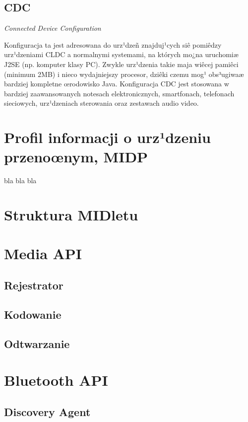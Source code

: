 \subsection{CDC}
\emph{Connected Device Configuration}

 Konfiguracja ta jest adresowana do urz¹dzeñ znajduj¹cych siê
 pomiêdzy urz¹dzeniami CLDC a normalnymi systemami, na których mo¿na
 uruchomiæ J2SE (np. komputer klasy PC). Zwykle urz¹dzenia takie
 maja wiêcej pamiêci (minimum 2MB) i nieco wydajniejszy procesor,
 dziêki czemu mog¹ obs³ugiwaæ bardziej kompletne œrodowisko Java.
 Konfiguracja CDC jest stosowana w bardziej zaawansowanych notesach
 elektronicznych, smartfonach, telefonach sieciowych, urz¹dzeniach
 sterowania oraz zestawach audio video.

\section{Profil informacji o urz¹dzeniu przenoœnym, MIDP}

bla bla bla

\section{Struktura MIDletu}

\section{Media API}


    \subsection{Rejestrator}
    \label{sec:Rejestrator}
    \subsection{Kodowanie}
    \label{sec:Kodowanie}
    \subsection{Odtwarzanie}
    \label{sec:Odtwarzanie}

\section{Bluetooth API}
\label{sec:Bluetooth API}

    \subsection{Discovery Agent}
